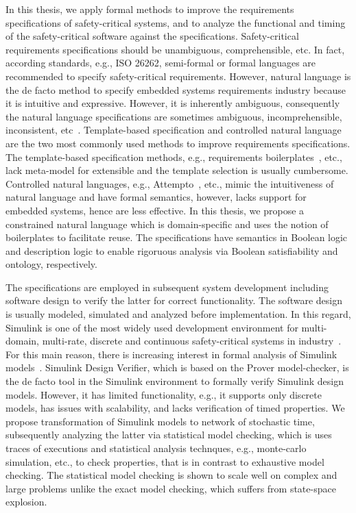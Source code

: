 In this thesis, we apply formal methods to improve the requirements specifications of safety-critical systems, and to analyze the functional and timing of the safety-critical software against the specifications. Safety-critical requirements specifications should be unambiguous, comprehensible, etc. In fact, according standards, e.g., ISO 26262, semi-formal or formal languages are recommended to specify safety-critical requirements. However, natural language is the de facto method to specify embedded systems requirements industry because it is intuitive and expressive. However, it is inherently ambiguous, consequently the natural language specifications are sometimes ambiguous, incomprehensible, inconsistent, etc~\cite{ieereqspecstandard}. Template-based specification and controlled natural language are the two most commonly used methods to improve requirements specifications. The template-based specification methods, e.g., requirements boilerplates~\cite{Hull2011RequirementsEngineering}, etc.,  lack meta-model for extensible and the template selection is usually cumbersome. Controlled natural languages, e.g., Attempto~\cite{attempto96}\cite{Fuchs2008AttemptoRepresentation}, etc., mimic the intuitiveness of natural language and have formal semantics, however, lacks support for embedded systems, hence are less effective. In this thesis, we propose a constrained natural language which is domain-specific and uses the notion of boilerplates to facilitate reuse. The specifications have semantics in Boolean logic and description logic to enable rigoruous analysis via Boolean satisfiability and ontology, respectively.

The specifications are employed in subsequent system development including software design to verify the latter for correct functionality. The software design is usually modeled, simulated and analyzed before implementation. In this regard, Simulink is one of the most widely used development environment for multi-domain, multi-rate, discrete and continuous safety-critical systems in industry~\cite{JamesB.Dabney2003MasteringSimulink}. For this main reason, there is increasing interest in formal analysis of Simulink models~\cite{Manamcheri2011AModels}\cite{Sims2007ExperienceReport}. Simulink Design Verifier, which is based on the Prover model-checker, is the de facto tool in the Simulink environment to formally verify Simulink design models. However, it has limited functionality, e.g., it supports only discrete models, has issues with scalability, and lacks verification of timed properties.  We propose transformation of Simulink models to network of stochastic time, subsequently analyzing the latter via statistical model checking, which is uses traces of executions and statistical analysis technques, e.g., monte-carlo simulation, etc., to check properties, that is in contrast to exhaustive model checking. The statistical model checking is shown to scale well on complex and large problems unlike the exact model checking, which suffers from state-space explosion.

